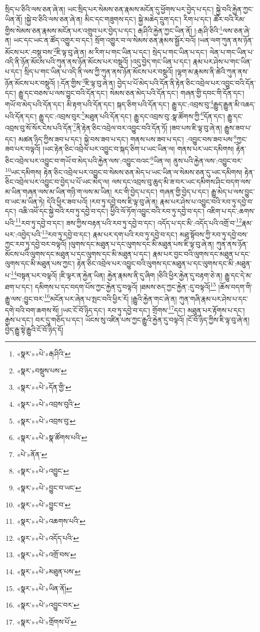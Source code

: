 སྲིད་པ་ཅིའི་ལས་ཅན་ཞེ་ན། ཡང་སྲིད་པར་སེམས་ཅན་རྣམས་མངོན་དུ་ཕྱོགས་པར་བྱེད་པ་དང་། སྐྱེ་བའི་རྐྱེན་ཀྱང་ཡིན་ནོ། །སྐྱེ་བ་ཅིའི་ལས་ཅན་ཞེ་ན། མིང་དང་གཟུགས་དང་། སྐྱེ་མཆེད་དྲུག་དང་། རིག་པ་དང་། ཚོར་བའི་རིམ་གྱིས་སེམས་ཅན་རྣམས་མངོན་པར་འགྲུབ་པར་བྱེད་པ་དང་། རྒ་ཤིའི་རྐྱེན་ཀྱང་ཡིན་ནོ། །:རྒ་ཤི་ཅིའི་\footnote{«སྣར་»«པེ་»རྒ་ཤིའི་}ལས་ཅན་ཞེ་ན། ཡང་དང་ཡང་ན་ཚོད་འགྱུར་བ་དང་། སྲོག་འགྱུར་བ་ལ་སེམས་ཅན་རྣམས་སྦྱོར་བའོ། །ཡན་ལག་ཀུན་ནས་ཉོན་མོངས་པར་:བསྡུ་བས་\footnote{«སྣར་»བསྡུས་པས་}ཇི་ལྟ་བུ་ཞེ་ན། མ་རིག་པ་གང་ཡིན་པ་དང་། སྲེད་པ་གང་ཡིན་པ་དང་། ལེན་པ་གང་ཡིན་པ་འདི་ནི་ཉོན་མོངས་པའི་ཀུན་ནས་ཉོན་མོངས་པར་བསྡུའོ། །འདུ་བྱེད་གང་ཡིན་པ་དང་། རྣམ་པར་ཤེས་པ་གང་ཡིན་པ་དང་། སྲིད་པ་གང་ཡིན་པ་འདི་ནི་ལས་ཀྱི་ཀུན་ནས་ཉོན་མོངས་པར་བསྡུའོ། །ལྷག་མ་རྣམས་ནི་ཚེའི་ཀུན་ནས་ཉོན་མོངས་པར་བསྡུའོ། །:དོན་གྱིས་\footnote{«སྣར་»«པེ་»དོན་གྱི་}ཇི་ལྟ་བུ་ཞེ་ན། བྱེད་པ་པོ་མེད་པའི་དོན་ནི་རྟེན་ཅིང་འབྲེལ་པར་འབྱུང་བའི་དོན་དང་། རྒྱུ་དང་བཅས་པ་ལས་བྱུང་བའི་དོན་དང་། སེམས་ཅན་མེད་པའི་དོན་དང་། གཞན་གྱི་དབང་གི་དོན་དང་། གཡོ་བ་མེད་པའི་དོན་དང་། མི་རྟག་པའི་དོན་དང་། སྐད་ཅིག་པའི་དོན་དང་། རྒྱུ་དང་:འབྲས་བུ་\footnote{«སྣར་»«པེ་»འབྲས་བུའི་}རྒྱུད་རྒྱུན་མི་འཆད་པའི་དོན་དང་། རྒྱུ་དང་:འབྲས་བུར་\footnote{«སྣར་»«པེ་»འབྲས་བུ་}མཐུན་པའི་དོན་དང་། རྒྱུ་དང་འབྲས་བུ་:སྣ་ཚོགས་ཀྱི་\footnote{«སྣར་»«པེ་»སྣ་ཚོགས་པའི་}དོན་དང་། རྒྱུ་དང་འབྲས་བུ་སོ་སོར་ངེས་པའི་དོན་\footnote{«པེ་»ནོན་}ནི་རྟེན་ཅིང་འབྲེལ་བར་འབྱུང་བའི་དོན་ཏོ། །ཟབ་པས་ཇི་ལྟ་བུ་ཞེ་ན། རྒྱུས་ཟབ་པ་དང་། མཚན་ཉིད་ཀྱིས་ཟབ་པ་དང་། སྐྱེ་བས་ཟབ་པ་དང་། གནས་པས་ཟབ་པ་དང་། :འབྱུང་བས་ཟབ་པས་\footnote{«སྣར་»«པེ་»འབྱུང་}ཀྱང་ཟབ་པར་བལྟའོ། །ཡང་རྟེན་ཅིང་འབྲེལ་པར་འབྱུང་བ་སྐད་ཅིག་པ་ཡང་ཡིན་ལ། གནས་པར་ཡང་དམིགས། རྟེན་ཅིང་འབྲེལ་པར་འབྱུང་བ་གཡོ་བ་མེད་པའི་རྐྱེན་ལས་:འབྱུང་བའང་\footnote{«སྣར་»«པེ་»བྱུང་བ་ཡང་}ཡིན་ལ། ནུས་པའི་རྐྱེན་ལས་:འབྱུང་བར་\footnote{«སྣར་»«པེ་»བྱུང་བ་}ཡང་དམིགས། རྟེན་ཅིང་འབྲེལ་པར་འབྱུང་བ་སེམས་ཅན་མེད་པ་ཡང་ཡིན་ལ་སེམས་ཅན་དུ་ཡང་དམིགས། རྟེན་ཅིང་འབྲེལ་པར་འབྱུང་བ་བྱེད་པ་པོ་ཡང་མེད་ལ། ལས་དང་འབྲས་བུ་ཆུད་མི་ཟ་བར་ཡང་དམིགས་ཤིང་བདག་ལས་མ་ཡིན་གཞན་ལས་མ་ཡིན་གཉི་ག་ལས་མ་ཡིན། རང་གི་བྱེད་པ་དང་། གཞན་གྱི་བྱེད་པ་དང་། རྒྱུ་མེད་པ་ལས་བྱུང་བ་ཡང་མ་ཡིན་ཏེ། དེའི་ཕྱིར་ཟབ་པའོ། །རབ་ཏུ་དབྱེ་བས་ཇི་ལྟ་བུ་ཞེ་ན། རྣམ་པར་ཤེས་པ་འབྱུང་བའི་རབ་ཏུ་དབྱེ་བ་དང་། འཆི་འཕོ་དང་སྐྱེ་བའི་རབ་ཏུ་དབྱེ་བ་དང་། ཕྱིའི་ལོ་ཏོག་འབྱུང་བའི་རབ་ཏུ་དབྱེ་བ་དང་། འཇིག་པ་དང་:ཆགས་པའི་\footnote{«སྣར་»«པེ་»འཆགས་པའི་}རབ་ཏུ་དབྱེ་བ་དང་། ཟས་ཀྱིས་བརྟན་པའི་རབ་ཏུ་དབྱེ་བ་དང་། འདོད་པ་དང་མི་:འདོད་པའི་འགྲོ་བ་\footnote{«སྣར་»«པེ་»འདོད་པའི་}རྣམ་པར་:འབྱེད་པའི་\footnote{«སྣར་»«པེ་»འགྲོ་བས་}རབ་ཏུ་དབྱེ་བ་དང་། རྣམ་པར་དག་པའི་རབ་ཏུ་དབྱེ་བ་དང་། མཐུ་སྟོབས་ཀྱི་རབ་ཏུ་དབྱེ་བས་ཀྱང་རབ་ཏུ་དབྱེ་བར་བལྟའོ། །ལུགས་དང་མཐུན་པ་དང་ལུགས་དང་མི་མཐུན་པས་ཇི་ལྟ་བུ་ཞེ་ན། ཀུན་ནས་ཉོན་མོངས་པའི་ལུགས་དང་མཐུན་པ་དང་ལུགས་དང་མི་མཐུན་པ་དང་། རྣམ་པར་བྱང་བའི་ལུགས་དང་མཐུན་པ་དང་ལུགས་དང་མི་མཐུན་པས་ཀྱང་། རྟེན་ཅིང་འབྲེལ་པར་འབྱུང་བའི་ལུགས་དང་མཐུན་པ་དང་ལུགས་དང་མི་:མཐུན་པ་\footnote{«སྣར་»«པེ་»མཐུན་པས་}བསྟན་པར་བལྟའོ། །ཇི་ལྟར་ན་རྐྱེན་ཡིན། རྐྱེན་རྣམས་ནི་དུ་ཞིག །ཅིའི་ཕྱིར་རྐྱེན་དུ་བརྟག་ཅེ་ན། རྒྱུ་དང་དེ་མ་ཐག་པ་དང་། དམིགས་པ་དང་བདག་པོས་ཀྱང་རྐྱེན་དུ་བལྟའོ། །ཐམས་ཅད་ཀྱང་རྐྱེན་:དུ་བལྟའོ།\footnote{«སྣར་»«པེ་»ཡིན་ནོ།} །ཆོས་བདག་གི་རྒྱུ་ལས་:བྱུང་བར་\footnote{«སྣར་»«པེ་»འབྱུང་བར་}མངོན་པར་ཞེན་པ་སྤང་བའི་ཕྱིར་རོ། །རྒྱུའི་རྐྱེན་གང་ཞེ་ན། ཀུན་གཞི་རྣམ་པར་ཤེས་པ་དང་དགེ་བའི་བག་ཆགས་སོ། །ཡང་ངོ་བོ་ཉིད་དང་། རབ་ཏུ་དབྱེ་བ་དང་། གྲོགས་\footnote{«སྣར་»«པེ་»གྲོགས་པོ་}དང་། མཐུན་པར་རྟོགས་པ་དང་། རྒྱས་པ་དང་། བར་དུ་གཅོད་པ་དང་། ཡོངས་སུ་འཛིན་པས་ཀྱང་རྒྱུའི་རྐྱེན་དུ་བལྟའོ། །ངོ་བོ་ཉིད་ཀྱིས་ཇི་ལྟ་བུ་ཞེ་ན། བྱེད་རྒྱུ་སྟེ་རྒྱུའི་ངོ་བོ་ཉིད་དོ། 